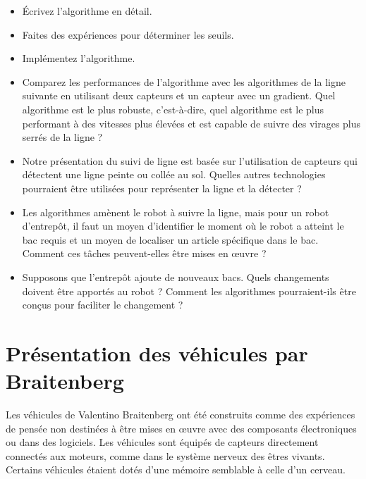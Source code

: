\begin{framed}
\begin{itemize}
\item Écrivez l'algorithme en détail.
\item Faites des expériences pour déterminer les seuils.
\item Implémentez l'algorithme.
\item Comparez les performances de l'algorithme avec les algorithmes de la ligne suivante en utilisant deux capteurs et un capteur avec un gradient. Quel algorithme est le plus robuste, c'est-à-dire, quel algorithme est le plus performant à des vitesses plus élevées et est capable de suivre des virages plus serrés de la ligne ?
\end{itemize}
\end{framed}

\begin{framed}
\begin{itemize}
\item Notre présentation du suivi de ligne est basée sur l'utilisation de capteurs qui détectent une ligne peinte ou collée au sol. Quelles autres technologies pourraient être utilisées pour représenter la ligne et la détecter ?
\item Les algorithmes amènent le robot à suivre la ligne, mais pour un robot d'entrepôt, il faut un moyen d'identifier le moment où le robot a atteint le bac requis et un moyen de localiser un article spécifique dans le bac. Comment ces tâches peuvent-elles être mises en œuvre ?
\item Supposons que l'entrepôt ajoute de nouveaux bacs. Quels changements doivent être apportés au robot ? Comment les algorithmes pourraient-ils être conçus pour faciliter le changement ?
\end{itemize}
\end{framed}

\section{Présentation des véhicules par Braitenberg}\label{s.abstract-vehicles}

Les véhicules de Valentino Braitenberg ont été construits comme des expériences de pensée non destinées à être mises en œuvre avec des composants électroniques ou dans des logiciels. Les véhicules sont équipés de capteurs directement connectés aux moteurs, comme dans le système nerveux des êtres vivants. Certains véhicules étaient dotés d'une mémoire semblable à celle d'un cerveau.

